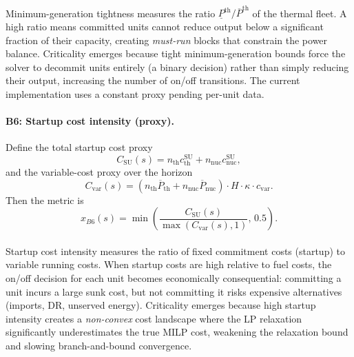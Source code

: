 \documentclass{article}
\begin{document}
\paragraph{}Minimum-generation tightness measures the ratio $\underline{P}^{\mathrm{th}} / \overline{P}^{\mathrm{th}}$ of the thermal fleet. A high ratio means committed units cannot reduce output below a significant fraction of their capacity, creating \emph{must-run} blocks that constrain the power balance. Criticality emerges because tight minimum-generation bounds force the solver to decommit units entirely (a binary decision) rather than simply reducing their output, increasing the number of on/off transitions. The current implementation uses a constant proxy pending per-unit data.

\paragraph{B6: Startup cost intensity (proxy).}
Define the total startup cost proxy
\begin{equation}
C_{\mathrm{SU}}(s)=n_{\mathrm{th}}c^{\mathrm{SU}}_{\mathrm{th}}+n_{\mathrm{nuc}}c^{\mathrm{SU}}_{\mathrm{nuc}},
\end{equation}
and the variable-cost proxy over the horizon
\begin{equation}
C_{\mathrm{var}}(s)=\left(n_{\mathrm{th}}\overline{P}_{\mathrm{th}}+n_{\mathrm{nuc}}\overline{P}_{\mathrm{nuc}}\right)\cdot H \cdot \kappa \cdot c_{\mathrm{var}}.
\end{equation}
Then the metric is
\begin{equation}
x_{B6}(s)=\min\!\left(\frac{C_{\mathrm{SU}}(s)}{\max(C_{\mathrm{var}}(s),1)},\,0.5\right).
\end{equation}

\paragraph{}Startup cost intensity measures the ratio of fixed commitment costs (startup) to variable running costs. When startup costs are high relative to fuel costs, the on/off decision for each unit becomes economically consequential: committing a unit incurs a large sunk cost, but not committing it risks expensive alternatives (imports, DR, unserved energy). Criticality emerges because high startup intensity creates a \emph{non-convex} cost landscape where the LP relaxation significantly underestimates the true MILP cost, weakening the relaxation bound and slowing branch-and-bound convergence.
\end{document}
